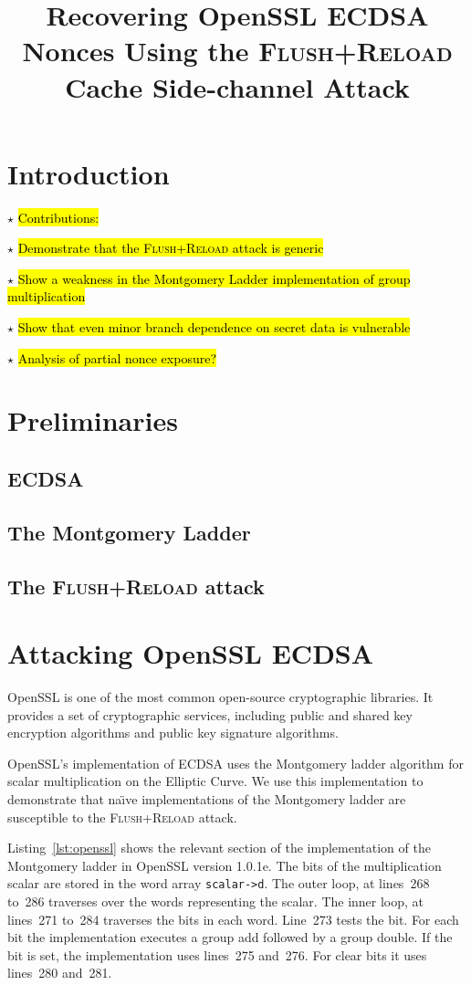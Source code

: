 \documentclass{llncs}
\newcommand{\starpar}[1]{\par{\footnotesize $\star$ \hl{#1}\par}}
\begin{document}
\title{Recovering OpenSSL ECDSA Nonces Using the \textsc{Flush+Reload} Cache Side-channel Attack}

\maketitle

\begin{abstract}
\end{abstract}

\section{Introduction}

\starpar{Contributions:}
\starpar{Demonstrate that the \textsc{Flush+Reload} attack is generic}
\starpar{Show a weakness in the Montgomery Ladder implementation of group multiplication}
\starpar{Show that even minor branch dependence on secret data is vulnerable}
\starpar{Analysis of partial nonce exposure?}
\section{Preliminaries}
\subsection{ECDSA}
\subsection{The Montgomery Ladder}
\subsection{The \textsc{Flush+Reload} attack}
\section{Attacking OpenSSL ECDSA}
OpenSSL is one of the most common open-source cryptographic libraries.
It provides a set of cryptographic services, including public and shared key encryption 
algorithms and public key signature algorithms.

OpenSSL's implementation of ECDSA uses the Montgomery ladder algorithm for scalar multiplication
on the Elliptic Curve.
We use this implementation to demonstrate that na{\"\i}ve implementations of the Montgomery ladder are
susceptible to the \textsc{Flush+Reload} attack.

Listing~\ref{lst:openssl} shows the relevant section of the implementation of the Montgomery ladder in OpenSSL version 1.0.1e.
The bits of the multiplication scalar are stored in the word array \texttt{scalar->d}.
The outer loop, at lines~268 to~286 traverses over the words representing the scalar.
The inner loop, at lines~271 to~284 traverses the bits in each word.
Line~273 tests the bit. 
For each bit the implementation executes a group add followed by a group double.
If the bit is set, the implementation uses lines~275 and~276.
For clear bits it uses lines~280 and~281.
\end{document}
